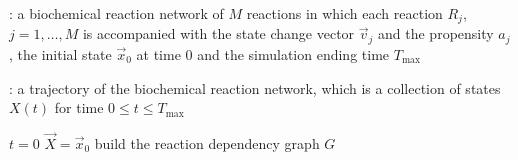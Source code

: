 \begin{algorithm}[H]
\DontPrintSemicolon
{}

\caption{\protect\TitleFunction{}}
\label{algo:mnrm}

\Input: a biochemical reaction network of $M$ reactions in which each reaction $R_j$, $j=1, \dots, M$ is accompanied with the state change vector $\vec{v}_j$ and the propensity $a_j$, the initial state $\vec{x}_0$ at time $0$ and the simulation ending time $T_{\max}$\;

\Output: a trajectory of the biochemical reaction network, which is a collection of states $X(t)$ for time $0\le t\le T_{\max}$\;

$t = 0$\;
$\vec{X} = \vec{x}_0$\;
build the reaction dependency graph $G$\;




\end{algorithm}
